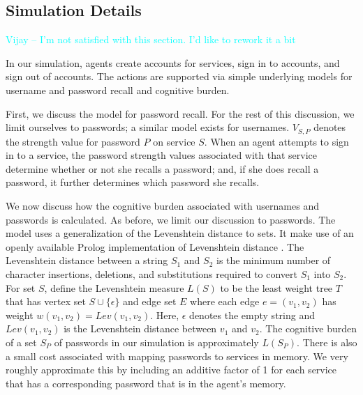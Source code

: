\documentclass[conference]{IEEEtran}
\newcommand\vedit[1]{\textcolor{cyan}{Vijay -- #1}}
\begin{document}
{\subsection{Simulation Details}

\vedit{I'm not satisfied with this section. I'd like to rework it a bit}

In our simulation, agents create accounts for services, sign 
in to accounts, and sign out of accounts. The actions are
supported via simple underlying models for username and 
password recall and cognitive burden.

First, we discuss the model for password recall. For the rest 
of this discussion, we limit ourselves to passwords; a similar 
model exists for usernames. $V_{S, P}$  denotes the strength 
value for password $P$ on service $S$. When an agent attempts 
to sign in to a service, the password strength values associated with 
that service determine whether or not she recalls a password; and, 
if she does recall a password, it further determines which 
password she recalls.

We now discuss how the cognitive burden associated with 
usernames and passwords is calculated. As before, we limit 
our discussion to passwords. The model uses a generalization 
of the Levenshtein distance to sets. It make use of an openly 
available Prolog implementation of Levenshtein distance \cite{levdist}. 
The Levenshtein distance between a string $S_1$ and $S_2$ is the 
minimum number of character insertions, deletions, and substitutions 
required to convert $S_1$ into $S_2$. For set $S$, define the 
Levenshtein measure $L(S)$ to be the least weight tree $T$ that has 
vertex set $S \cup \{\epsilon\}$ and edge set $E$ where each edge 
$e = (v_1, v_2)$ has weight $w(v_1, v_2) = Lev(v_1, v_2)$. Here, 
$\epsilon$ denotes the empty string and $Lev(v_1, v_2)$ is the 
Levenshtein distance between $v_1$ and $v_2$. The cognitive 
burden of a set $S_P$ of passwords in our simulation is approximately 
$L(S_P)$. There is also a small cost associated with mapping 
passwords to services in memory. We very roughly approximate this 
by including an additive factor of 1 for each service that has a 
corresponding password that is in the agent's memory.

}
\end{document}
